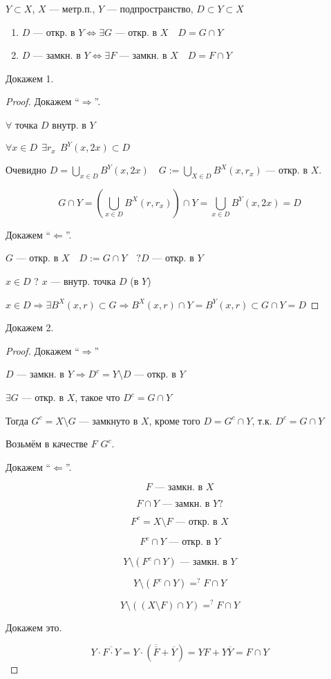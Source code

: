 \begin{theorem}
    $Y\subset X$, $X$ --- метр.п., $Y$ --- подпространство, $D\subset Y\subset X$

    \begin{enumerate}
        \item $D$ --- откр. в $Y \Leftrightarrow \exists G$ --- откр. в $X \quad D=G\cap Y$
        \item $D$ --- замкн. в $Y \Leftrightarrow \exists F$ --- замкн. в $X \quad D=F\cap Y$
    \end{enumerate}
\end{theorem}

\noindent
Докажем 1.
\begin{proof}
    Докажем ``$\Rightarrow$''.

    $\forall$ точка $D$ внутр. в $Y$

    $\forall x\in D \ \ \exists r_x \ \ B^Y(x,2x)\subset D$

    Очевидно $D=\bigcup\limits_{x\in D} B^Y(x,2x) \quad G:=\bigcup\limits_{X\in D} B^X(x,r_x)$ --- откр. в $X$.

    $$G\cap Y=(\bigcup\limits_{x\in D} B^X(r,r_x))\cap Y=\bigcup\limits_{x\in D}B^Y(x,2x)=D$$

    Докажем ``$\Leftarrow$''.

    $G$ --- откр. в $X\quad D:=G\cap Y \quad ?D$ --- откр. в $Y$ 

    $x\in D$ ? $x$ --- внутр. точка $D$ (в $Y$)

    $x\in D \Rightarrow \exists B^X(x,r)\subset G \Rightarrow B^X(x,r)\cap Y=B^Y(x,r)\subset G\cap Y=D$
\end{proof}

\noindent
Докажем 2.
\begin{proof}
    Докажем ``$\Rightarrow$''

    $D$ --- замкн. в $Y \Rightarrow D^c=Y\setminus D$ --- откр. в $Y$

    $\exists G$ --- откр. в $X$, такое что $D^c=G\cap Y$

    Тогда $G^c=X\setminus G$ --- замкнуто в $X$, кроме того $D=G^c\cap Y$, т.к. $D^c=G\cap Y$

    Возьмём в качестве $F$ $G^c$.

    Докажем ``$\Leftarrow$''.

    $$F\text{ --- замкн. в }X$$

    $$F\cap Y\text{ --- замкн. в }Y?$$

    $$F^c=X\setminus F\text{ --- откр. в }X$$

    $$F^c\cap Y\text{ --- откр. в }Y$$
    
    $$Y\setminus (F^c\cap Y) \text{ --- замкн. в }Y$$

    $$Y\setminus (F^c\cap Y) =^? F\cap Y$$

    $$Y\setminus ((X\setminus F)\cap Y) =^? F\cap Y$$

    Докажем это.

    $$Y\cdot\overline{F\cdot Y}=Y\cdot(\overline{\overline F}+\overline Y)=YF+Y\overline Y=F\cap Y$$
\end{proof}

